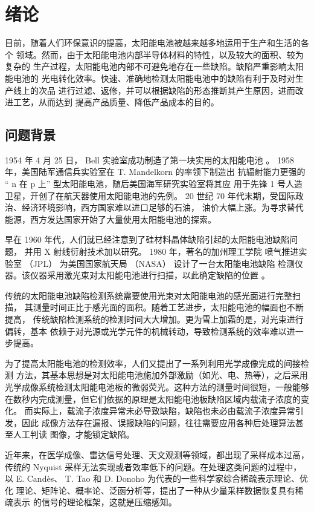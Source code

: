 \chapter{绪论}

目前，随着人们环保意识的提高，太阳能电池被越来越多地运用于生产和生活的各个
领域。然而，由于太阳能电池内部半导体材料的特性，以及较大的面积、较为复杂的
生产过程，太阳能电池内部不可避免地存在一些缺陷。缺陷严重影响太阳能电池的
光电转化效率。快速、准确地检测太阳能电池中的缺陷有利于及时对生产线上的次品
进行过滤、返修，并可以根据缺陷的形态推断其产生原因，进而改进工艺，从而达到
提高产品质量、降低产品成本的目的。

\section{问题背景}

1954 年 4 月 25 日， Bell 实验室成功制造了第一块实用的太阳能电池
\cite{First}。 1958 年，美国陆军通信兵实验室在 T. Mandelkorn 的率领下制造出
抗辐射能力更强的 “ n 在 p 上” 型太阳能电池，随后美国海军研究实验室将其应
用于先锋 1 号人造卫星，开创了在航天器使用太阳能电池的先例\cite{Vanguard}。
20 世纪 70 年代末期，受国际政治、经济环境影响，西方国家难以进口足够的石油，
油价大幅上涨。为寻求替代能源，西方发达国家开始了大量使用太阳能电池的探索。

早在 1960 年代，人们就已经注意到了硅材料晶体缺陷引起的太阳能电池缺陷问题，
并用 X 射线衍射技术加以研究\cite{SiliconXray}。 1980 年，著名的加州理工学院
喷气推进实验室 （JPL） 为美国国家航天局 （NASA） 设计了一台太阳能电池缺陷
检测仪器。该仪器采用激光束对太阳能电池进行扫描，以此确定缺陷的位置
\cite{JPLDefectAnalyzer}。

传统的太阳能电池缺陷检测系统需要使用光束对太阳能电池的感光面进行完整扫描，
其测量时间正比于感光面的面积。随着工艺进步，太阳能电池的幅面也不断提高，
传统缺陷检测系统的检测时间大大增加。更为雪上加霜的是，对光束进行偏转，基本
依赖于对光源或光学元件的机械转动，导致检测系统的效率难以进一步提高。

为了提高太阳能电池的检测效率，人们又提出了一系列利用光学成像完成的间接检测
方法，其基本思想是对太阳能电池施加外部激励（如光、电、热等），之后采用
光学成像系统检测太阳能电池板的微弱荧光。这种方法的测量时间很短，一般能够
在数秒内完成测量，但它们依据的原理是太阳能电池板缺陷区域内载流子浓度的变化。
而实际上，载流子浓度异常未必导致缺陷，缺陷也未必由载流子浓度异常引发，因此
成像方法存在漏报、误报缺陷的问题，往往需要应用各种后处理算法甚至人工判读
图像，才能锁定缺陷。

近年来，在医学成像、雷达信号处理、天文观测等领域，都出现了采样成本过高，
传统的 Nyquist 采样无法实现或者效率低下的问题。在处理这类问题的过程中，以
E. Cand\`es、 T. Tao 和 D. Donoho 为代表的一些科学家综合稀疏表示理论、优化
理论、矩阵论、概率论、泛函分析等，提出了一种从少量采样数据恢复具有稀疏表示
的信号的理论框架，这就是压缩感知。

